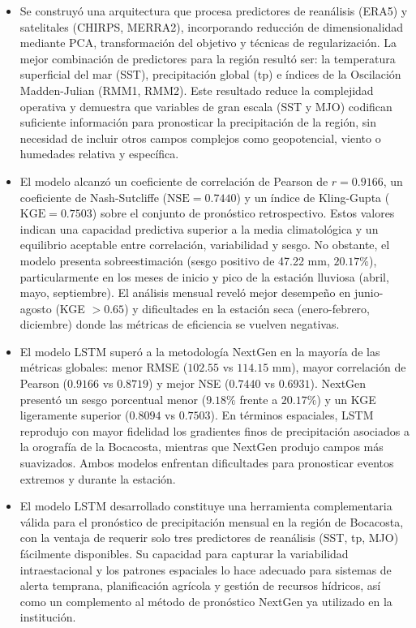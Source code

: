 \begin{itemize}
	\item Se construyó una arquitectura que procesa predictores de reanálisis (ERA5) y satelitales (CHIRPS, MERRA2), incorporando reducción de dimensionalidad mediante PCA, transformación del objetivo y técnicas de regularización. La mejor combinación de predictores para la región resultó ser: la temperatura superficial del mar (SST), precipitación global (tp) e índices de la Oscilación Madden-Julian (RMM1, RMM2). Este resultado reduce la complejidad operativa y demuestra que variables de gran escala (SST y MJO) codifican suficiente información para pronosticar la precipitación de la región, sin necesidad de incluir otros campos complejos como geopotencial, viento o humedades relativa y específica.
	
	\item El modelo alcanzó un coeficiente de correlación de Pearson de \(r = 0.9166\), un coeficiente de Nash-Sutcliffe (\(\text{NSE}=0.7440\)) y un índice de Kling-Gupta (\(\text{KGE}=0.7503\)) sobre el conjunto de pronóstico retrospectivo. Estos valores indican una capacidad predictiva superior a la media climatológica y un equilibrio aceptable entre correlación, variabilidad y sesgo. No obstante, el modelo presenta sobreestimación (sesgo positivo de 47.22 mm, \(20.17\%\)), particularmente en los meses de inicio y pico de la estación lluviosa (abril, mayo, septiembre). El análisis mensual reveló mejor desempeño en junio-agosto (KGE \(>0.65\)) y dificultades en la estación seca (enero-febrero, diciembre) donde las métricas de eficiencia se vuelven negativas.
	
	\item  El modelo LSTM superó a la metodología NextGen en la mayoría de las métricas globales: menor RMSE (\(102.55\) vs \(114.15\) mm), mayor correlación de Pearson (\(0.9166\) vs \(0.8719\)) y mejor NSE (\(0.7440\) vs \(0.6931\)). NextGen presentó un sesgo porcentual menor (\(9.18\%\) frente a \(20.17\%\)) y un KGE ligeramente superior (\(0.8094\) vs \(0.7503\)). En términos espaciales, LSTM reprodujo con mayor fidelidad los gradientes finos de precipitación asociados a la orografía de la Bocacosta, mientras que NextGen produjo campos más suavizados. Ambos modelos enfrentan dificultades para pronosticar eventos extremos y durante la estación.
	
	\item El modelo LSTM desarrollado constituye una herramienta complementaria válida para el pronóstico de precipitación mensual en la región de Bocacosta, con la ventaja de requerir solo tres predictores de reanálisis (SST, tp, MJO) fácilmente disponibles. Su capacidad para capturar la variabilidad intraestacional y los patrones espaciales lo hace adecuado para sistemas de alerta temprana, planificación agrícola y gestión de recursos hídricos, así como un complemento al método de pronóstico NextGen ya utilizado en la institución.
\end{itemize}